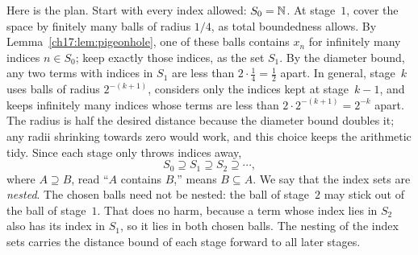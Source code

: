 Here is the plan. Start with every index allowed: $S_0=\mathbb N$. At stage~$1$, cover the space by finitely many balls of radius $1/4$, as total boundedness allows. By Lemma~\ref{ch17:lem:pigeonhole}, one of these balls contains $x_n$ for infinitely many indices $n\in S_0$; keep exactly those indices, as the set $S_1$. By the diameter bound, any two terms with indices in $S_1$ are less than $2\cdot\tfrac14=\tfrac12$ apart. In general, stage~$k$ uses balls of radius $2^{-(k+1)}$, considers only the indices kept at stage~$k-1$, and keeps infinitely many indices whose terms are less than $2\cdot2^{-(k+1)}=2^{-k}$ apart. The radius is half the desired distance because the diameter bound doubles it; any radii shrinking towards zero would work, and this choice keeps the arithmetic tidy. Since each stage only throws indices away,
\[
 S_0\supseteq S_1\supseteq S_2\supseteq\cdots,
\]
where $A\supseteq B$, read ``$A$ contains $B$,'' means $B\subseteq A$. We say that the index sets are \emph{nested}. The chosen balls need not be nested: the ball of stage~$2$ may stick out of the ball of stage~$1$. That does no harm, because a term whose index lies in $S_2$ also has its index in $S_1$, so it lies in both chosen balls. The nesting of the index sets carries the distance bound of each stage forward to all later stages.
